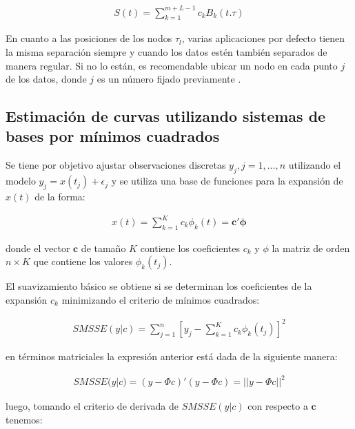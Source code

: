 \documentclass[
]{book}
\begin{document}
\begin{align*}
    S(t)=\sum_{k=1}^{m+L-1} {c_{k}B_{k}(t.\tau)}
\end{align*}

En cuanto a las posiciones de los nodos \(\tau_l\), varias aplicaciones por defecto tienen la misma separación siempre y cuando los datos estén también separados de manera regular. Si no lo están, es recomendable ubicar un nodo en cada punto \(j\) de los datos, donde \(j\) es un número fijado previamente \citep{ramsay}.

\hypertarget{estimaciuxf3n-de-curvas-utilizando-sistemas-de-bases-por-muxednimos-cuadrados}{%
\subsection*{Estimación de curvas utilizando sistemas de bases por mínimos cuadrados}\label{estimaciuxf3n-de-curvas-utilizando-sistemas-de-bases-por-muxednimos-cuadrados}}

Se tiene por objetivo ajustar observaciones discretas \(y_j,j=1,...,n\) utilizando el modelo \(y_j=x(t_j)+\epsilon_j\) y se utiliza una base de funciones para la expansión de \(x(t)\) de la forma:

\begin{align*}
    x(t)=\sum_{k=1}^Kc_k\phi_k(t)=\mathbf{c'} \boldsymbol{\phi}
\end{align*}

donde el vector \(\textbf{c}\) de tamaño \(K\) contiene los coeficientes \(c_k\) y \(\phi\) la matriz de orden \(n\times K\) que contiene los valores \(\phi_k(t_j)\).

El suavizamiento básico se obtiene si se determinan los coeficientes de la expansión \(c_k\) minimizando el criterio de mínimos cuadrados:

\begin{align*}
    SMSSE(y|c)=\sum_{j=1}^n[y_j-\sum_{k=1}^Kc_k\phi_k(t_j)]^2
\end{align*}

en términos matriciales la expresión anterior está dada de la siguiente manera:

\begin{align*}
    SMSSE(y|c)=(y-\Phi c)'(y-\Phi c)=||y-\Phi c||^2
\end{align*}

luego, tomando el criterio de derivada de \(SMSSE(y|c)\) con respecto a \(\textbf{c}\) tenemos:
\end{document}
